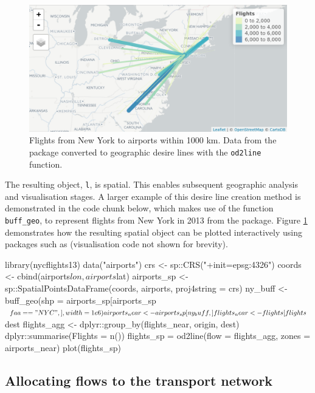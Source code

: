 \begin{figure}
\includegraphics[width=\textwidth]{flights} \caption[Flights from New York]{Flights from New York to airports within 1000 km. Data from the  package converted to geographic desire lines with the \texttt{od2line} function.}\label{fig:flights}
\end{figure}

The resulting object, \texttt{l}, is spatial.
This enables subsequent geographic analysis and visualisation stages.
A larger example of this desire line creation method is demonstrated in the code chunk below, which makes use of the function \texttt{buff\_geo}, to represent flights from New York in 2013 from the  package.
Figure \ref{fig:flights} demonstrates how the resulting spatial object can be plotted interactively using packages such as  (visualisation code not shown for brevity).

\begin{Schunk}
\begin{Sinput}
library(nycflights13)
data("airports")
crs <- sp::CRS("+init=epsg:4326")
coords <- cbind(airports$lon, airports$lat)
airports_sp <- sp::SpatialPointsDataFrame(coords, airports, proj4string = crs)
ny_buff <- buff_geo(shp = airports_sp[airports_sp$faa == "NYC",], width = 1e6)
airports_near <- airports_sp[ny_buff,]
flights_near <- flights[flights$dest %
flights_agg <- dplyr::group_by(flights_near, origin, dest) %
  dplyr::summarise(Flights = n())
flights_sp = od2line(flow = flights_agg, zones = airports_near)
plot(flights_sp)
\end{Sinput}
\end{Schunk}

\subsection{Allocating flows to the transport
network}\label{allocating-flows-to-the-transport-network}

